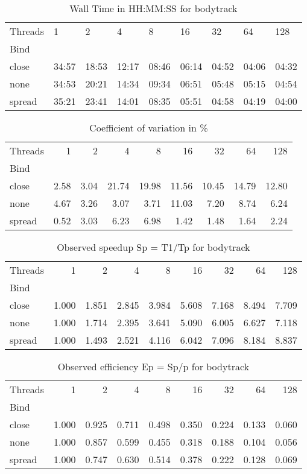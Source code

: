 \begin{table}
\caption{Wall Time in HH:MM:SS for bodytrack}
\label{tab:time_bodytrack}
\begin{tabular}{lllllllll}
\toprule
Threads & 1 & 2 & 4 & 8 & 16 & 32 & 64 & 128 \\
Bind &  &  &  &  &  &  &  &  \\
\midrule
close & 34:57 & 18:53 & 12:17 & 08:46 & 06:14 & 04:52 & 04:06 & 04:32 \\
none & 34:53 & 20:21 & 14:34 & 09:34 & 06:51 & 05:48 & 05:15 & 04:54 \\
spread & 35:21 & 23:41 & 14:01 & 08:35 & 05:51 & 04:58 & 04:19 & 04:00 \\
\bottomrule
\end{tabular}
\end{table}
\begin{table}
\caption{Coefficient of variation in \%}
\label{tab:cv_bodytrack}
\begin{tabular}{lrrrrrrrr}
\toprule
Threads & 1 & 2 & 4 & 8 & 16 & 32 & 64 & 128 \\
Bind &  &  &  &  &  &  &  &  \\
\midrule
close & 2.58 & 3.04 & 21.74 & 19.98 & 11.56 & 10.45 & 14.79 & 12.80 \\
none & 4.67 & 3.26 & 3.07 & 3.71 & 11.03 & 7.20 & 8.74 & 6.24 \\
spread & 0.52 & 3.03 & 6.23 & 6.98 & 1.42 & 1.48 & 1.64 & 2.24 \\
\bottomrule
\end{tabular}
\end{table}
\begin{table}
\caption{Observed speedup Sp = T1/Tp for bodytrack}
\label{tab:speedup_bodytrack}
\begin{tabular}{lrrrrrrrr}
\toprule
Threads & 1 & 2 & 4 & 8 & 16 & 32 & 64 & 128 \\
Bind &  &  &  &  &  &  &  &  \\
\midrule
close & 1.000 & 1.851 & 2.845 & 3.984 & 5.608 & 7.168 & 8.494 & 7.709 \\
none & 1.000 & 1.714 & 2.395 & 3.641 & 5.090 & 6.005 & 6.627 & 7.118 \\
spread & 1.000 & 1.493 & 2.521 & 4.116 & 6.042 & 7.096 & 8.184 & 8.837 \\
\bottomrule
\end{tabular}
\end{table}
\begin{table}
\caption{Observed efficiency Ep = Sp/p for bodytrack}
\label{tab:eff_bodytrack}
\begin{tabular}{lrrrrrrrr}
\toprule
Threads & 1 & 2 & 4 & 8 & 16 & 32 & 64 & 128 \\
Bind &  &  &  &  &  &  &  &  \\
\midrule
close & 1.000 & 0.925 & 0.711 & 0.498 & 0.350 & 0.224 & 0.133 & 0.060 \\
none & 1.000 & 0.857 & 0.599 & 0.455 & 0.318 & 0.188 & 0.104 & 0.056 \\
spread & 1.000 & 0.747 & 0.630 & 0.514 & 0.378 & 0.222 & 0.128 & 0.069 \\
\bottomrule
\end{tabular}
\end{table}
